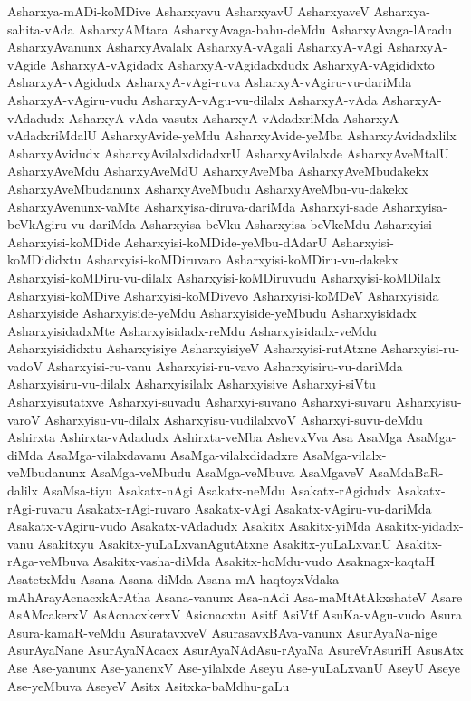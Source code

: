 {Asharxya-mADi-koMDive
Asharxyavu
AsharxyavU
AsharxyaveV
Asharxya-sahita-vAda
AsharxyAMtara
AsharxyAvaga-bahu-deMdu
AsharxyAvaga-lAradu
AsharxyAvanunx
AsharxyAvalalx
AsharxyA-vAgali
AsharxyA-vAgi
AsharxyA-vAgide
AsharxyA-vAgidadx
AsharxyA-vAgidadxdudx
AsharxyA-vAgididxto
AsharxyA-vAgidudx
AsharxyA-vAgi-ruva
AsharxyA-vAgiru-vu-dariMda
AsharxyA-vAgiru-vudu
AsharxyA-vAgu-vu-dilalx
AsharxyA-vAda
AsharxyA-vAdadudx
AsharxyA-vAda-vasutx
AsharxyA-vAdadxriMda
AsharxyA-vAdadxriMdalU
AsharxyAvide-yeMdu
AsharxyAvide-yeMba
AsharxyAvidadxlilx
AsharxyAvidudx
AsharxyAvilalxdidadxrU
AsharxyAvilalxde
AsharxyAveMtalU
AsharxyAveMdu
AsharxyAveMdU
AsharxyAveMba
AsharxyAveMbudakekx
AsharxyAveMbudanunx
AsharxyAveMbudu
AsharxyAveMbu-vu-dakekx
AsharxyAvenunx-vaMte
Asharxyisa-diruva-dariMda
Asharxyi-sade
Asharxyisa-beVkAgiru-vu-dariMda
Asharxyisa-beVku
Asharxyisa-beVkeMdu
Asharxyisi
Asharxyisi-koMDide
Asharxyisi-koMDide-yeMbu-dAdarU
Asharxyisi-koMDididxtu
Asharxyisi-koMDiruvaro
Asharxyisi-koMDiru-vu-dakekx
Asharxyisi-koMDiru-vu-dilalx
Asharxyisi-koMDiruvudu
Asharxyisi-koMDilalx
Asharxyisi-koMDive
Asharxyisi-koMDivevo
Asharxyisi-koMDeV
Asharxyisida
Asharxyiside
Asharxyiside-yeMdu
Asharxyiside-yeMbudu
Asharxyisidadx
AsharxyisidadxMte
Asharxyisidadx-reMdu
Asharxyisidadx-veMdu
Asharxyisididxtu
Asharxyisiye
AsharxyisiyeV
Asharxyisi-rutAtxne
Asharxyisi-ru-vadoV
Asharxyisi-ru-vanu
Asharxyisi-ru-vavo
Asharxyisiru-vu-dariMda
Asharxyisiru-vu-dilalx
Asharxyisilalx
Asharxyisive
Asharxyi-siVtu
Asharxyisutatxve
Asharxyi-suvadu
Asharxyi-suvano
Asharxyi-suvaru
Asharxyisu-varoV
Asharxyisu-vu-dilalx
Asharxyisu-vudilalxvoV
Asharxyi-suvu-deMdu
Ashirxta
Ashirxta-vAdadudx
Ashirxta-veMba
AshevxVva
Asa
AsaMga
AsaMga-diMda
AsaMga-vilalxdavanu
AsaMga-vilalxdidadxre
AsaMga-vilalx-veMbudanunx
AsaMga-veMbudu
AsaMga-veMbuva
AsaMgaveV
AsaMdaBaR-dalilx
AsaMsa-tiyu
Asakatx-nAgi
Asakatx-neMdu
Asakatx-rAgidudx
Asakatx-rAgi-ruvaru
Asakatx-rAgi-ruvaro
Asakatx-vAgi
Asakatx-vAgiru-vu-dariMda
Asakatx-vAgiru-vudo
Asakatx-vAdadudx
Asakitx
Asakitx-yiMda
Asakitx-yidadx-vanu
Asakitxyu
Asakitx-yuLaLxvanAgutAtxne
Asakitx-yuLaLxvanU
Asakitx-rAga-veMbuva
Asakitx-vasha-diMda
Asakitx-hoMdu-vudo
Asaknagx-kaqtaH
AsatetxMdu
Asana
Asana-diMda
Asana-mA-haqtoyxVdaka-mAhArayAcnacxkArAtha
Asana-vanunx
Asa-nAdi
Asa-maMtAtAkxshateV
Asare
AsAMcakerxV
AsAcnacxkerxV
Asicnacxtu
Asitf
AsiVtf
AsuKa-vAgu-vudo
Asura
Asura-kamaR-veMdu
AsuratavxveV
AsurasavxBAva-vanunx
AsurAyaNa-nige
AsurAyaNane
AsurAyaNAcacx
AsurAyaNAdAsu-rAyaNa
AsureVrAsuriH
AsusAtx
Ase
Ase-yanunx
Ase-yanenxV
Ase-yilalxde
Aseyu
Ase-yuLaLxvanU
AseyU
Aseye
Ase-yeMbuva
AseyeV
Asitx
Asitxka-baMdhu-gaLu
}
